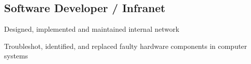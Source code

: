 \documentclass[letter,10pt]{article}
\begin{document}
\subsection{{Software Developer / Infranet}}
\begin{zitemize}
\item Designed, implemented and maintained internal network
\item Troubleshot, identified, and replaced faulty hardware components in computer systems
\end{zitemize}
\end{document}
